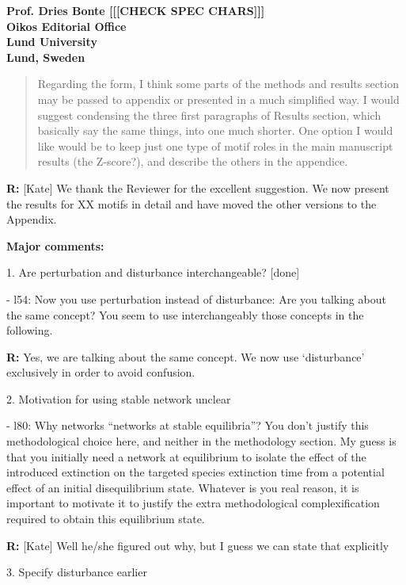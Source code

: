\documentclass[12pt]{letter}
\begin{document}
\begin{letter}{\bf Prof. Dries Bonte [[[CHECK SPEC CHARS]]]\\
Oikos Editorial Office \\
Lund University \\
Lund, Sweden}
  \begin{quotation}
  Regarding the form, I think some parts of the methods and results section may be passed to appendix or presented in a much simplified way. I would suggest condensing the three first paragraphs of Results section, which basically say the same things, into one much shorter. One option I would like would be to keep just one type of motif roles in the main manuscript results (the Z-score?), and describe the others in the appendice.
  \end{quotation}

  \textbf{R:} [Kate] We thank the Reviewer for the excellent suggestion. We now present the results for XX motifs in detail and have moved the other versions to the Appendix.


  \textbf{Major comments:}

    1. Are perturbation and disturbance interchangeable? [done]

      - l54: Now you use perturbation instead of disturbance: Are you talking about the same concept? You seem to use interchangeably those concepts in the following.

      \textbf{R:} Yes, we are talking about the same concept. We now use `disturbance' exclusively in order to avoid confusion.


    2. Motivation for using stable network unclear

      - l80: Why networks “networks at stable equilibria”? You don’t justify this methodological choice here, and neither in the methodology section. My guess is that you initially need a network at equilibrium to isolate the effect of the introduced extinction on the targeted species extinction time from a potential effect of an initial disequilibrium state. Whatever is you real reason, it is important to motivate it to justify the extra methodological complexification required to obtain this equilibrium state.

      \textbf{R:} [Kate]
      Well he/she figured out why, but I guess we can state that explicitly


    3. Specify disturbance earlier


\end{letter}
\end{document}
